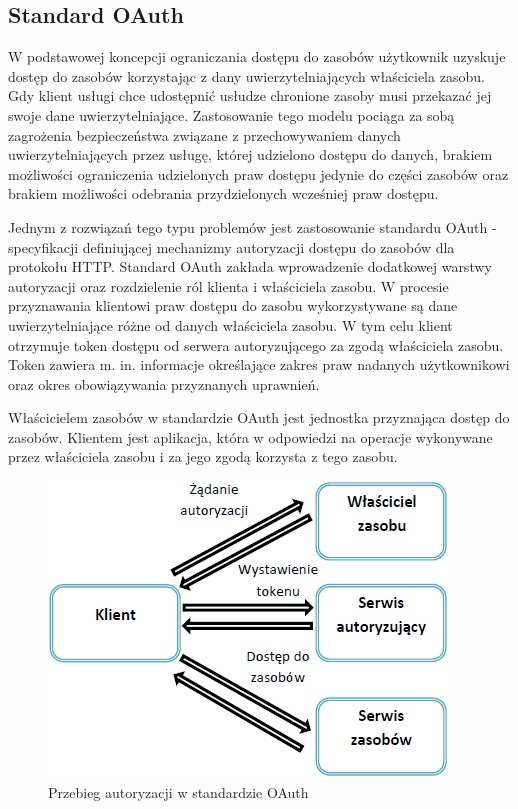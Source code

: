 	\subsection{Standard OAuth}

		W podstawowej koncepcji ograniczania dostępu do zasobów użytkownik uzyskuje dostęp do zasobów korzystając z dany uwierzytelniających właściciela zasobu. Gdy klient usługi chce udostępnić usłudze chronione zasoby musi przekazać jej swoje dane uwierzytelniające.  Zastosowanie tego modelu pociąga za sobą zagrożenia bezpieczeństwa związane z przechowywaniem danych uwierzytelniających przez usługę, której udzielono dostępu do danych, brakiem możliwości ograniczenia udzielonych praw dostępu jedynie do części zasobów oraz brakiem możliwości odebrania przydzielonych wcześniej praw dostępu.

		Jednym z rozwiązań tego typu problemów jest zastosowanie standardu OAuth - specyfikacji definiującej mechanizmy autoryzacji dostępu do zasobów dla protokołu HTTP\cite{Hardt12}. Standard OAuth zakłada wprowadzenie dodatkowej warstwy autoryzacji  oraz rozdzielenie ról klienta i właściciela zasobu. W procesie przyznawania klientowi praw dostępu do zasobu wykorzystywane są dane uwierzytelniające różne od danych właściciela zasobu. W tym celu klient otrzymuje token dostępu od serwera autoryzującego za zgodą właściciela zasobu. Token zawiera m. in. informacje określające zakres praw nadanych użytkownikowi oraz okres obowiązywania przyznanych uprawnień. 

		Właścicielem zasobów w standardzie OAuth jest jednostka przyznająca dostęp do zasobów. Klientem jest aplikacja, która w odpowiedzi na operacje wykonywane przez  właściciela zasobu i za jego zgodą korzysta z tego zasobu.

		\begin{figure}[h]
			\centering
				\includegraphics{img/oauth.jpg}
			\caption{Przebieg autoryzacji w standardzie OAuth}
			\label{Przebieg autoryzacji w standardzie OAuth}
		\end{figure}

